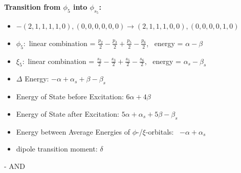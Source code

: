 \documentclass[12pt,a4paper]{article}
\begin{document}
        \noindent\textbf{Transition from $\phi_{5}$ into $\phi_{s_{5}}$:}
        \begin{itemize}
            \item $- (2, 1, 1, 1, 1, 0), (0, 0, 0, 0, 0, 0) \rightarrow (2, 1, 1, 1, 0, 0), (0, 0, 0, 0, 1, 0)$
        
            \item $\phi_{5}:$ linear combination = $\frac{p_{2}}{2} - \frac{p_{3}}{2} + \frac{p_{5}}{2} - \frac{p_{6}}{2}$, \
            energy = $\alpha - \beta$
            
            \item $\xi_{5}:$ linear combination = $\frac{s_{2}}{2} - \frac{s_{3}}{2} + \frac{s_{5}}{2} - \frac{s_{6}}{2}$, \
            energy = $\alpha_{s} - \beta_{s}$
            
            \item $\Delta$ Energy: $- \alpha + \alpha_{s} + \beta - \beta_{s}$
            \item Energy of State before Excitation: $6 \alpha + 4 \beta$
            \item Energy of State after Excitation: $5 \alpha + \alpha_{s} + 5 \beta - \beta_{s}$
            \item Energy between Average Energies of $\phi$-/$\xi$-orbitals: \
            $- \alpha + \alpha_{s}$
        
            \item dipole transition moment: $\delta$
        
        \end{itemize}
        
 -  AND 
\end{document}
